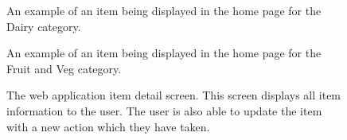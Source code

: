 \documentclass[a4paper,11pt]{report}
\begin{document}
\begin{appendix}
\begin{figure}[H]
        \caption{An example of an item being displayed in the home page for the Dairy category.}
        \label{fig:endpointExample}
    \end{figure}
    \begin{figure}[H]
        \centering
        \caption{An example of an item being displayed in the home page for the Fruit and Veg category.}
        \label{fig:endpointTest}
    \end{figure}
    \begin{figure}[H]
        \centering
        \caption{The web application item detail screen. This screen displays all item information to the user. The user is also able to update the item with a new action which they have taken.}
        \label{fig:endpointTestResponse}
    \end{figure}
    

\end{appendix}
\end{document}

